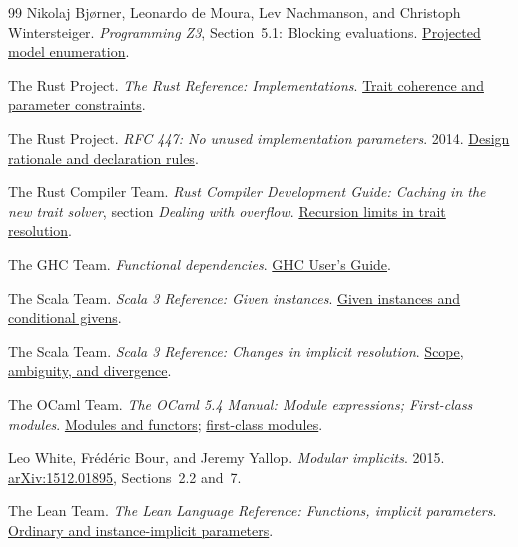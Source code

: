 \documentclass[10pt,a4paper]{article}
\begin{document}
\begin{thebibliography}{99}
Nikolaj Bj{\o}rner, Leonardo de Moura, Lev Nachmanson, and Christoph Wintersteiger.
\emph{Programming Z3}, Section~5.1: Blocking evaluations.
\href{https://z3prover.github.io/papers/programmingz3.html}{Projected model enumeration}.

The Rust Project.
\emph{The Rust Reference: Implementations}.
\href{https://doc.rust-lang.org/reference/items/implementations.html}{Trait coherence and parameter constraints}.

The Rust Project.
\emph{RFC 447: No unused implementation parameters}. 2014.
\href{https://rust-lang.github.io/rfcs/0447-no-unused-impl-parameters.html}{Design rationale and declaration rules}.

The Rust Compiler Team.
\emph{Rust Compiler Development Guide: Caching in the new trait solver},
section \emph{Dealing with overflow}.
\href{https://rustc-dev-guide.rust-lang.org/solve/caching.html#dealing-with-overflow}{Recursion limits in trait resolution}.

The GHC Team.
\emph{Functional dependencies}.
\href{https://ghc.gitlab.haskell.org/ghc/doc/users_guide/exts/functional_dependencies.html}{GHC User's Guide}.

The Scala Team.
\emph{Scala 3 Reference: Given instances}.
\href{https://docs.scala-lang.org/scala3/reference/contextual/givens.html}{Given instances and conditional givens}.

The Scala Team.
\emph{Scala 3 Reference: Changes in implicit resolution}.
\href{https://docs.scala-lang.org/scala3/reference/changed-features/implicit-resolution.html}
 {Scope, ambiguity, and divergence}.

The OCaml Team.
\emph{The OCaml 5.4 Manual: Module expressions; First-class modules}.
\href{https://ocaml.org/manual/5.4/modules.html}{Modules and functors};
\href{https://ocaml.org/manual/5.4/firstclassmodules.html}{first-class modules}.

Leo White, Fr\'ed\'eric Bour, and Jeremy Yallop.
\emph{Modular implicits}. 2015.
\href{https://arxiv.org/abs/1512.01895}{arXiv:1512.01895}, Sections~2.2 and~7.

The Lean Team.
\emph{The Lean Language Reference: Functions, implicit parameters}.
\href{https://lean-lang.org/doc/reference/latest/Terms/Functions/}{Ordinary and instance-implicit parameters}.


\end{thebibliography}
\end{document}
